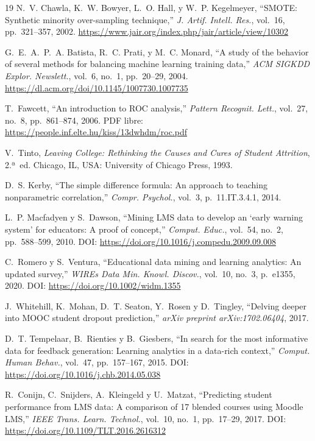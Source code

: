 \documentclass[12pt, letterpaper, openany]{report}
\begin{document}
\begin{thebibliography}{19}
N.~V. Chawla, K.~W. Bowyer, L.~O. Hall, y W.~P. Kegelmeyer,
``SMOTE: Synthetic minority over-sampling technique,''
\textit{J. Artif. Intell. Res.}, vol.~16, pp.~321--357, 2002.
\url{https://www.jair.org/index.php/jair/article/view/10302}

G.~E.~A.~P.~A. Batista, R.~C. Prati, y M.~C. Monard,
``A study of the behavior of several methods for balancing
machine learning training data,''
\textit{ACM SIGKDD Explor. Newslett.}, vol.~6, no.~1,
pp.~20--29, 2004.
\url{https://dl.acm.org/doi/10.1145/1007730.1007735}

T.~Fawcett, ``An introduction to ROC analysis,''
\textit{Pattern Recognit. Lett.}, vol.~27, no.~8,
pp.~861--874, 2006.
PDF libre: \url{https://people.inf.elte.hu/kiss/13dwhdm/roc.pdf}

V.~Tinto,
\textit{Leaving College: Rethinking the Causes and Cures of
Student Attrition}, 2.ª~ed.
Chicago, IL, USA: University of Chicago Press, 1993.

D.~S. Kerby,
``The simple difference formula: An approach to teaching
nonparametric correlation,''
\textit{Compr. Psychol.}, vol.~3, p.~11.IT.3.4.1, 2014.

L.~P. Macfadyen y S.~Dawson,
``Mining LMS data to develop an `early warning system' for educators:
A proof of concept,''
\textit{Comput. Educ.}, vol.~54, no.~2, pp.~588--599, 2010.
DOI: \url{https://doi.org/10.1016/j.compedu.2009.09.008}

C.~Romero y S.~Ventura,
``Educational data mining and learning analytics: An updated survey,''
\textit{WIREs Data Min. Knowl. Discov.}, vol.~10, no.~3, p.~e1355, 2020.
DOI: \url{https://doi.org/10.1002/widm.1355}

J.~Whitehill, K.~Mohan, D.~T. Seaton, Y.~Rosen y D.~Tingley,
``Delving deeper into MOOC student dropout prediction,''
\textit{arXiv preprint arXiv:1702.06404}, 2017.

D.~T. Tempelaar, B.~Rienties y B.~Giesbers,
``In search for the most informative data for feedback generation:
Learning analytics in a data-rich context,''
\textit{Comput. Human Behav.}, vol.~47, pp.~157--167, 2015.
DOI: \url{https://doi.org/10.1016/j.chb.2014.05.038}

R.~Conijn, C.~Snijders, A.~Kleingeld y U.~Matzat,
``Predicting student performance from LMS data: A comparison of
17 blended courses using Moodle LMS,''
\textit{IEEE Trans. Learn. Technol.}, vol.~10, no.~1, pp.~17--29, 2017.
DOI: \url{https://doi.org/10.1109/TLT.2016.2616312}

\end{thebibliography}
\end{document}
